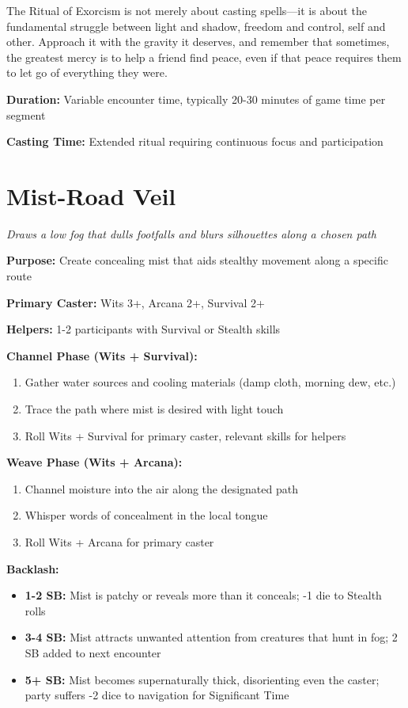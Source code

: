 \documentclass[12pt,twoside]{book}
\begin{document}
The Ritual of Exorcism is not merely about casting spells—it is about the fundamental struggle between light and shadow, freedom and control, self and other. Approach it with the gravity it deserves, and remember that sometimes, the greatest mercy is to help a friend find peace, even if that peace requires them to let go of everything they were.

\textbf{Duration:} Variable encounter time, typically 20-30 minutes of game time per segment

\textbf{Casting Time:} Extended ritual requiring continuous focus and participation

\section*{Mist-Road Veil}
\textit{Draws a low fog that dulls footfalls and blurs silhouettes along a chosen path}

\textbf{Purpose:} Create concealing mist that aids stealthy movement along a specific route

\textbf{Primary Caster:} Wits 3+, Arcana 2+, Survival 2+

\textbf{Helpers:} 1-2 participants with Survival or Stealth skills

\textbf{Channel Phase (Wits + Survival):}
\begin{enumerate}
\item Gather water sources and cooling materials (damp cloth, morning dew, etc.)
\item Trace the path where mist is desired with light touch
\item Roll Wits + Survival for primary caster, relevant skills for helpers
\end{enumerate}

\textbf{Weave Phase (Wits + Arcana):}
\begin{enumerate}
\item Channel moisture into the air along the designated path
\item Whisper words of concealment in the local tongue
\item Roll Wits + Arcana for primary caster
\end{enumerate}

\textbf{Backlash:}
\begin{itemize}
\item \textbf{1-2 SB:} Mist is patchy or reveals more than it conceals; -1 die to Stealth rolls
\item \textbf{3-4 SB:} Mist attracts unwanted attention from creatures that hunt in fog; 2 SB added to next encounter
\item \textbf{5+ SB:} Mist becomes supernaturally thick, disorienting even the caster; party suffers -2 dice to navigation for Significant Time
\end{itemize}
\end{document}
